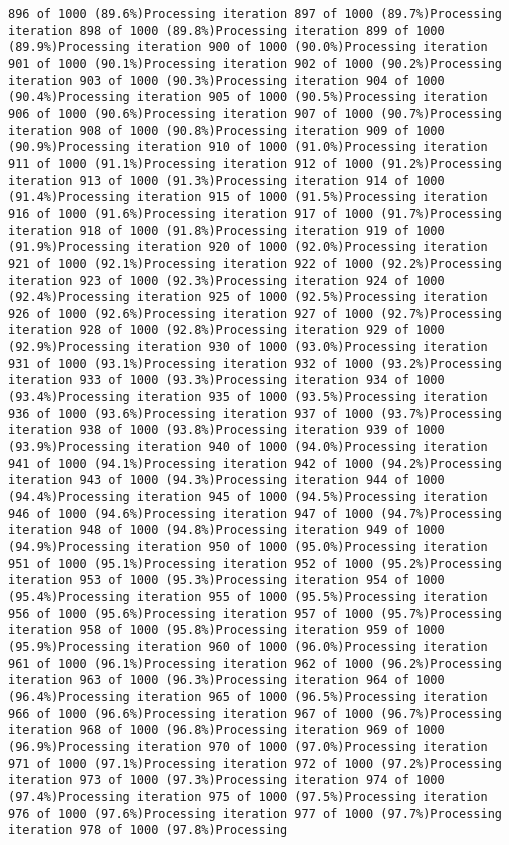 \documentclass[
]{article}
\begin{document}
\begin{verbatim}
896 of 1000 (89.6%)Processing iteration 897 of 1000 (89.7%)Processing iteration 898 of 1000 (89.8%)Processing iteration 899 of 1000 (89.9%)Processing iteration 900 of 1000 (90.0%)Processing iteration 901 of 1000 (90.1%)Processing iteration 902 of 1000 (90.2%)Processing iteration 903 of 1000 (90.3%)Processing iteration 904 of 1000 (90.4%)Processing iteration 905 of 1000 (90.5%)Processing iteration 906 of 1000 (90.6%)Processing iteration 907 of 1000 (90.7%)Processing iteration 908 of 1000 (90.8%)Processing iteration 909 of 1000 (90.9%)Processing iteration 910 of 1000 (91.0%)Processing iteration 911 of 1000 (91.1%)Processing iteration 912 of 1000 (91.2%)Processing iteration 913 of 1000 (91.3%)Processing iteration 914 of 1000 (91.4%)Processing iteration 915 of 1000 (91.5%)Processing iteration 916 of 1000 (91.6%)Processing iteration 917 of 1000 (91.7%)Processing iteration 918 of 1000 (91.8%)Processing iteration 919 of 1000 (91.9%)Processing iteration 920 of 1000 (92.0%)Processing iteration 921 of 1000 (92.1%)Processing iteration 922 of 1000 (92.2%)Processing iteration 923 of 1000 (92.3%)Processing iteration 924 of 1000 (92.4%)Processing iteration 925 of 1000 (92.5%)Processing iteration 926 of 1000 (92.6%)Processing iteration 927 of 1000 (92.7%)Processing iteration 928 of 1000 (92.8%)Processing iteration 929 of 1000 (92.9%)Processing iteration 930 of 1000 (93.0%)Processing iteration 931 of 1000 (93.1%)Processing iteration 932 of 1000 (93.2%)Processing iteration 933 of 1000 (93.3%)Processing iteration 934 of 1000 (93.4%)Processing iteration 935 of 1000 (93.5%)Processing iteration 936 of 1000 (93.6%)Processing iteration 937 of 1000 (93.7%)Processing iteration 938 of 1000 (93.8%)Processing iteration 939 of 1000 (93.9%)Processing iteration 940 of 1000 (94.0%)Processing iteration 941 of 1000 (94.1%)Processing iteration 942 of 1000 (94.2%)Processing iteration 943 of 1000 (94.3%)Processing iteration 944 of 1000 (94.4%)Processing iteration 945 of 1000 (94.5%)Processing iteration 946 of 1000 (94.6%)Processing iteration 947 of 1000 (94.7%)Processing iteration 948 of 1000 (94.8%)Processing iteration 949 of 1000 (94.9%)Processing iteration 950 of 1000 (95.0%)Processing iteration 951 of 1000 (95.1%)Processing iteration 952 of 1000 (95.2%)Processing iteration 953 of 1000 (95.3%)Processing iteration 954 of 1000 (95.4%)Processing iteration 955 of 1000 (95.5%)Processing iteration 956 of 1000 (95.6%)Processing iteration 957 of 1000 (95.7%)Processing iteration 958 of 1000 (95.8%)Processing iteration 959 of 1000 (95.9%)Processing iteration 960 of 1000 (96.0%)Processing iteration 961 of 1000 (96.1%)Processing iteration 962 of 1000 (96.2%)Processing iteration 963 of 1000 (96.3%)Processing iteration 964 of 1000 (96.4%)Processing iteration 965 of 1000 (96.5%)Processing iteration 966 of 1000 (96.6%)Processing iteration 967 of 1000 (96.7%)Processing iteration 968 of 1000 (96.8%)Processing iteration 969 of 1000 (96.9%)Processing iteration 970 of 1000 (97.0%)Processing iteration 971 of 1000 (97.1%)Processing iteration 972 of 1000 (97.2%)Processing iteration 973 of 1000 (97.3%)Processing iteration 974 of 1000 (97.4%)Processing iteration 975 of 1000 (97.5%)Processing iteration 976 of 1000 (97.6%)Processing iteration 977 of 1000 (97.7%)Processing iteration 978 of 1000 (97.8%)Processing 
\end{verbatim}
\end{document}
